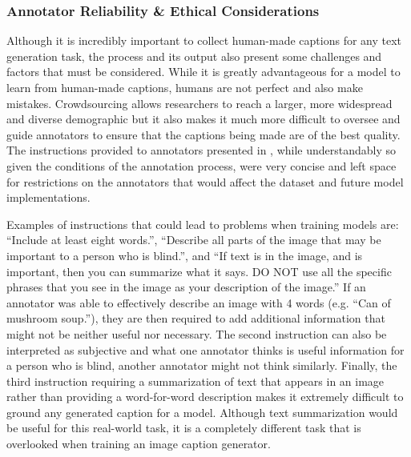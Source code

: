 \documentclass[11pt,a4paper]{article}
\begin{document}
\subsubsection{Annotator Reliability \& Ethical Considerations}
Although it is incredibly important to collect human-made captions for any text generation task, the process and its output also present some challenges and factors that must be considered. While it is greatly advantageous for a model to learn from human-made captions, humans are not perfect and also make mistakes. Crowdsourcing allows researchers to reach a larger, more widespread and diverse demographic but it also makes it much more difficult to oversee and guide annotators to ensure that the captions being made are of the best quality. The instructions provided to annotators presented in \citet{Gurari-2020-captioning}, while understandably so given the conditions of the annotation process, were very concise and left space for restrictions on the annotators that would affect the dataset and future model implementations.  

Examples of instructions that could lead to problems when training models are: “Include at least eight words.”, “Describe all parts of the image that may be important to a person who is blind.”, and “If text is in the image, and is important, then you can summarize what it says. DO NOT use all the specific phrases that you see in the image as your description of the image.” \citep{Gurari-2020-captioning} If an annotator was able to effectively describe an image with 4 words (e.g. “Can of mushroom soup.”), they are then required to add additional information that might not be neither useful nor necessary. The second instruction can also be interpreted as subjective and what one annotator thinks is useful information for a person who is blind, another annotator might not think similarly. Finally, the third instruction requiring a summarization of text that appears in an image rather than providing a word-for-word description makes it extremely difficult to ground any generated caption for a model. Although text summarization would be useful for this real-world task, it is a completely different task that is overlooked when training an image caption generator. 
\end{document}
